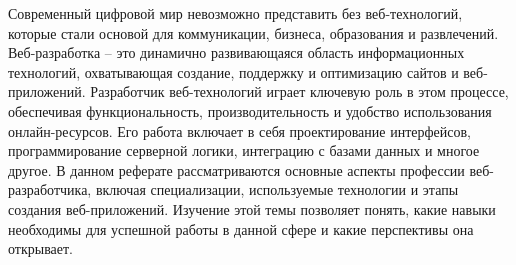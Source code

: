 \documentclass[referat]{SCWorks}
\begin{document}

\date{2025}

\maketitle

\secNumbering

\tableofcontents








\intro

Современный цифровой мир невозможно представить без веб-технологий, которые стали основой для коммуникации, бизнеса, образования и развлечений. Веб-разработка -- это динамично развивающаяся область информационных технологий, охватывающая создание, поддержку и оптимизацию сайтов и веб-приложений. Разработчик веб-технологий играет ключевую роль в этом процессе, обеспечивая функциональность, производительность и удобство использования онлайн-ресурсов. Его работа включает в себя проектирование интерфейсов, программирование серверной логики, интеграцию с базами данных и многое другое. В данном реферате рассматриваются основные аспекты профессии веб-разработчика, включая специализации, используемые технологии и этапы создания веб-приложений. Изучение этой темы позволяет понять, какие навыки необходимы для успешной работы в данной сфере и какие перспективы она открывает.\cite{web_technologies}
\end{document}
